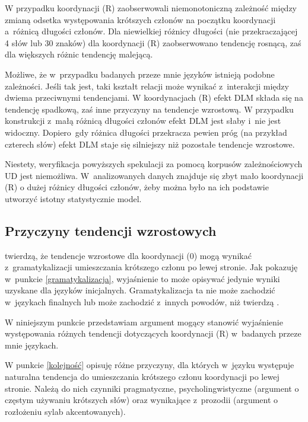 W przypadku koordynacji (R) \cite{przepiorkowski2024argument} zaobserwowali niemonotoniczną zależność między zmianą odsetka występowania krótszych członów na początku koordynacji a~różnicą długości członów. Dla niewielkiej różnicy długości (nie przekraczającej 4 słów lub 30 znaków) dla koordynacji (R) zaobserwowano tendencję rosnącą, zaś dla większych różnic tendencję malejącą. 

Możliwe, że w~przypadku badanych przeze mnie języków istnieją podobne zależności. Jeśli tak jest, taki kształt relacji  może wynikać z~interakcji między dwiema przeciwnymi tendencjami. W koordynacjach (R) efekt DLM składa się na tendencję spadkową, zaś inne przyczyny na tendencje wzrostową. W przypadku konstrukcji z~małą różnicą długości członów efekt DLM jest słaby i~nie jest widoczny. Dopiero~gdy różnica długości przekracza pewien próg (na przykład czterech słów) efekt DLM staje się silniejszy niż pozostałe tendencje wzrostowe.

Niestety, weryfikacja powyższych spekulacji za pomocą korpusów zależnościowych UD jest niemożliwa. W~analizowanych danych znajduje się zbyt mało koordynacji (R) o dużej różnicy długości członów, żeby można było na ich podstawie utworzyć istotny statystycznie model.

\subsection{Przyczyny tendencji wzrostowych}

\cite{przepiorkowski2023conjunct} twierdzą, że tendencje wzrostowe dla koordynacji (0) mogą wynikać z~gramatykalizacji umieszczania krótszego członu po lewej stronie. Jak pokazuję w~punkcie \ref{gramatykalizacja}, wyjaśnienie to może opisywać jedynie wyniki uzyskane dla języków inicjalnych. Gramatykalizacja ta nie może zachodzić w~językach finalnych lub może zachodzić z~innych powodów, niż twierdzą \cite{przepiorkowski2023conjunct}.

W niniejszym punkcie przedstawiam argument mogący stanowić wyjaśnienie występowania różnych tendencji dotyczących koordynacji (R) w~badanych przeze mnie językach.

W punkcie \ref{kolejność} opisuję różne przyczyny, dla których w~języku występuje naturalna tendencja do umieszczania krótszego członu koordynacji po lewej stronie. Należą do nich czynniki pragmatyczne, psycholingwistyczne (argument o częstym używaniu krótszych słów) oraz  wynikające z~prozodii (argument o rozłożeniu sylab akcentowanych). 

